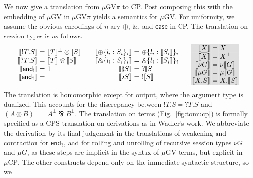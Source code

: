 \documentclass[orivec,envcountsame]{llncs}
\makeatletter
\newcommand{\with}{\mathbin\binampersand}
\newcommand{\parr}{\mathbin\bindnasrepma}
\newcommand{\cpdual}[1]{#1^\perp}
\newcommand{\cpbang}[1]{{! #1}}
\newcommand{\cpquery}[1]{{? #1}}
\newcommand{\gvdual}[1]{\overline{#1}}
\newcommand{\gvout}[2]{{!#1.#2}}
\newcommand{\gvin}[2]{{?#1.#2}}
\newcommand{\outterm}{\mkwd{end}_!}
\newcommand{\interm}{\mkwd{end}_?}
\newcommand{\gvserver}[1]{\flat #1}
\newcommand{\gvservice}[1]{\sharp #1}
\newcommand{\mkwd}[1]{\mathsf{#1}}
\newcommand{\key}{\mkwd}
\newcommand{\tocp}[1]{\llbracket #1 \rrbracket}
\newcommand{\mucp}{$\mu\mathrm{CP}$\xspace}
\newcommand{\mugv}{$\mu\mathrm{GV}$\xspace}
\newcommand{\gvpi}{$\mu\mathrm{GV}\pi$\xspace}
\newcommand{\ba}{\begin{array}}
\newcommand{\ea}{\end{array}}
\newenvironment{eqs}{\ba{@{}r@{~}c@{~}l@{}}}{\ea}
\newcommand\shaderow{\noalign{\vskip-0.4pt}\rowcolor{shade}[0.6mm]}
\makeatother
\begin{document}
We now give a translation from \gvpi to CP. Post composing this with the embedding of \mugv in \gvpi
yields a semantics for \mugv. For uniformity, we assume the obvious encodings of $n$-ary $\oplus$,
$\with$, and $\key{case}$ in CP. The translation on session types is as follows:
\small\[
\ba{@{}c@{\qquad}c@{\qquad}c@{}}
\begin{eqs}
\tocp{\gvout{T}{S}}        &=& \cpdual{\tocp{T}} \otimes \tocp{S} \\
\tocp{\gvin{T}{S}}         &=& \tocp{T} \parr \tocp{S} \\
\tocp{\outterm}            &=& 1 \\
\tocp{\interm}             &=& \bot \\
\end{eqs}
&
\begin{eqs}
\tocp{\oplus \{l_i:S_i \}_i} &=& \oplus \{l_i:\tocp{S_i}\}_i \\
\tocp{\with \{l_i:S_i \}_i}  &=& \with \{l_i:\tocp{S_i}\}_i \\
\tocp{\gvservice{S}}       &=& \cpquery{\tocp{S}} \\
\tocp{\gvserver{S}}        &=& \cpbang{\tocp{S}} \\
\end{eqs}
&
\begin{eqs}\shaderow
\tocp{X}                   &=& X \\ \shaderow
\tocp{\gvdual{X}}          &=& \cpdual{X} \\ \shaderow
\tocp{\nu G}                &=& \nu\tocp{G} \\ \shaderow
\tocp{\mu G}                &=& \mu\tocp{G} \\ \shaderow
\tocp{X.S}                  &=& X.\tocp{S} \\
\end{eqs}\\
\ea
\]\normalsize
The translation is homomorphic except for output, where the argument type is dualized. This accounts
for the discrepancy between $\gvdual{\gvout{T}{S}} = \gvin{T}{\gvdual{S}}$ and $\cpdual{(A \otimes
  B)} = \cpdual{A} \parr \cpdual{B}.$
%
The translation on terms (Fig.~\ref{fig:tomucp}) is formally specified as a CPS translation on
derivations as in Wadler's work. We abbreviate the derivation by its final judgement in the
translations of weakening and contraction for $\interm$, and for rolling and unrolling of recursive
session types $\nu G$ and $\mu G$, as these steps are implicit in the syntax of \mugv terms, but
explicit in \mucp. The other constructs depend only on the immediate syntactic structure, so we
\end{document}
